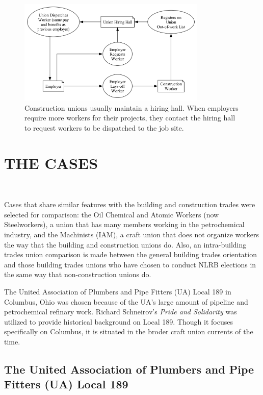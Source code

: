 \documentclass[12pt]{article}
\newcommand{\imageWidth}{0.8\textwidth}
\begin{document}
\begin{figure}[ht]
  \centering
  \includegraphics[width=\imageWidth]{images/hiring_hall}
  \captionsetup{justification=centering, singlelinecheck=false, margin=2cm} 
  \caption[Union Hiring Hall]{Construction unions usually maintain a hiring hall. When employers require more workers for their projects, they contact the hiring hall to request workers to be dispatched to the job site.}
  \label{fig:hiring_hall}
\end{figure}

\section{THE CASES} \

Cases that share similar features with the building and construction trades were selected for comparison: the Oil Chemical and Atomic Workers (now Steelworkers), a union that has many members working in the petrochemical industry, and the Machinists (IAM), a craft union that does not organize workers the way that the building and construction unions do. Also, an intra-building trades union comparison is made between the general building trades orientation and those building trades unions who have chosen to conduct NLRB elections in the same way that non-construction unions do.

The United Association of Plumbers and Pipe Fitters (UA) Local 189 in Columbus, Ohio was chosen because of the UA's large amount of pipeline and petrochemical refinary work. Richard Schneirov's \textit{Pride and Solidarity} was utilized to provide historical background on Local 189. Though it focuses specifically on Columbus, it is situated in the broder craft union currents of the time.

\subsection{The United Association of Plumbers and Pipe Fitters (UA) Local 189} \
\end{document}
